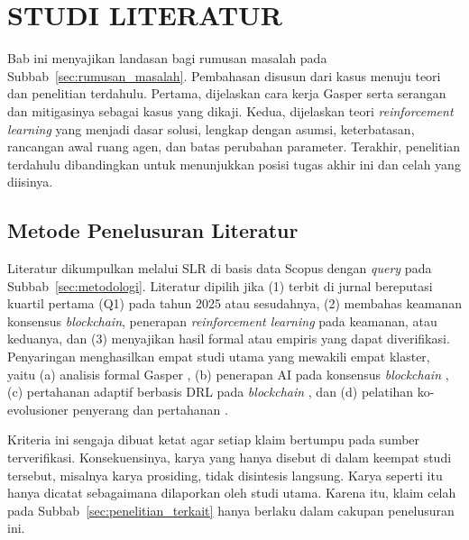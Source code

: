 \cleardoublepage %
\chapter{STUDI LITERATUR}
\label{chap:studi-literatur}

Bab ini menyajikan landasan bagi rumusan masalah pada Subbab~\ref{sec:rumusan_masalah}. Pembahasan disusun dari kasus menuju teori dan penelitian terdahulu. Pertama, dijelaskan cara kerja Gasper serta serangan dan mitigasinya sebagai kasus yang dikaji. Kedua, dijelaskan teori \textit{reinforcement learning} yang menjadi dasar solusi, lengkap dengan asumsi, keterbatasan, rancangan awal ruang agen, dan batas perubahan parameter. Terakhir, penelitian terdahulu dibandingkan untuk menunjukkan posisi tugas akhir ini dan celah yang diisinya.

\section{Metode Penelusuran Literatur}
\label{sec:metode_slr}
Literatur dikumpulkan melalui SLR di basis data Scopus dengan \textit{query} pada Subbab~\ref{sec:metodologi}. Literatur dipilih jika (1) terbit di jurnal bereputasi kuartil pertama (Q1) pada tahun 2025 atau sesudahnya, (2) membahas keamanan konsensus \textit{blockchain}, penerapan \textit{reinforcement learning} pada keamanan, atau keduanya, dan (3) menyajikan hasil formal atau empiris yang dapat diverifikasi. Penyaringan menghasilkan empat studi utama yang mewakili empat klaster, yaitu (a) analisis formal Gasper \parencite{laneve2025stochastic}, (b) penerapan AI pada konsensus \textit{blockchain} \parencite{rizal2025enhancing}, (c) pertahanan adaptif berbasis DRL pada \textit{blockchain} \parencite{skowronski2026adaptive}, dan (d) pelatihan ko-evolusioner penyerang dan pertahanan \parencite{wushishi2026coadam}.

Kriteria ini sengaja dibuat ketat agar setiap klaim bertumpu pada sumber terverifikasi. Konsekuensinya, karya yang hanya disebut di dalam keempat studi tersebut, misalnya karya prosiding, tidak disintesis langsung. Karya seperti itu hanya dicatat sebagaimana dilaporkan oleh studi utama. Karena itu, klaim celah pada Subbab~\ref{sec:penelitian_terkait} hanya berlaku dalam cakupan penelusuran ini.

